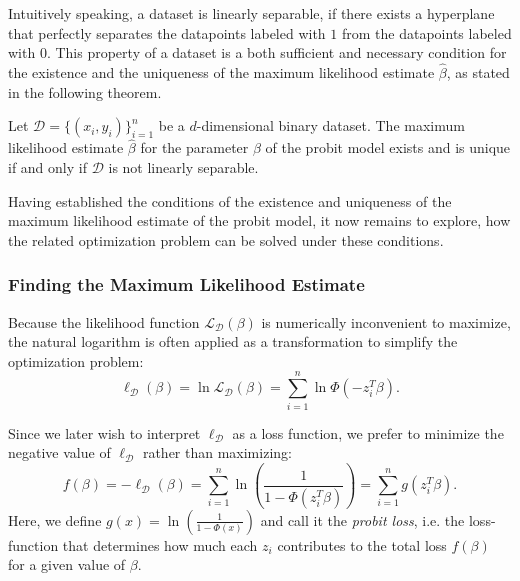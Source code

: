 \noindent Intuitively speaking, a dataset is linearly separable, if there
exists a hyperplane that perfectly separates the datapoints labeled
with $1$ from the datapoints labeled with $0$.
This property of a dataset is a both sufficient and
necessary condition for the existence and the uniqueness of the
maximum likelihood estimate $\hat{\beta}$, as stated in the following
theorem.

\begin{theorem}
    \label{theorem:probit-existence}
    Let $\mathcal{D}=\{(x_i, y_i)\}_{i=1}^n$ be a $d$-dimensional
    binary dataset.
    The maximum likelihood estimate $\hat{\beta}$ for the
    parameter $\beta$ of the probit model
    exists and is unique if and only if $\mathcal{D}$
    is not linearly separable.
\end{theorem}

\noindent Having established the conditions of the existence
and uniqueness of the maximum likelihood estimate of
the probit model, it now remains to explore,
how the related optimization
problem can be solved under these conditions.

\subsubsection{Finding the Maximum Likelihood Estimate}

Because the likelihood function $\mathcal{L}_\mathcal{D}(\beta)$ is
numerically inconvenient to maximize, the natural logarithm is often
applied as a transformation to simplify the optimization problem:
\begin{equation}
    \ell_\mathcal{D}(\beta) = \ln \mathcal{L}_\mathcal{D}(\beta) = \sum_{i=1}^n \ln \Phi(- z_i^T \beta).
\end{equation}

\noindent Since we later wish to interpret $\ell_\mathcal{D}$ as a loss function, we prefer
to minimize the negative value of $\ell_\mathcal{D}$ rather than maximizing:
\begin{equation}
    f(\beta) = -\ell_\mathcal{D}(\beta)
    = \sum_{i=1}^n \ln \left( \frac{1}{1 - \Phi(z_i^T \beta)} \right)
    = \sum_{i=1}^n g(z_i^T \beta).
\end{equation}
Here, we define $g(x) = \ln \left(\frac{1}{1 - \Phi(x)}\right)$
and call it the \textit{probit loss}, i.e. the loss-function that
determines how much each $z_i$ contributes to the total loss $f(\beta)$
for a given value of $\beta$.

